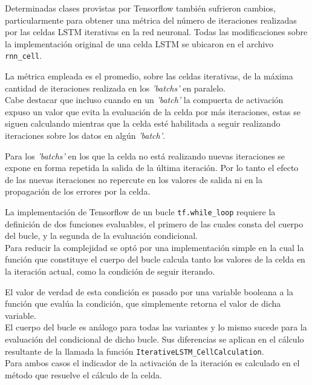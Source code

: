 \documentclass{article}
\begin{document}
Determinadas clases provistas por Tensorflow también sufrieron cambios, particularmente para obtener una métrica del número de iteraciones realizadas por las celdas LSTM iterativas en la red neuronal. Todas las modificaciones sobre la implementación original de una celda LSTM se ubicaron en el archivo \texttt{rnn\_cell}.

La métrica empleada es el promedio, sobre las celdas iterativas, de la máxima cantidad de iteraciones realizada en los \textit{'batchs'} en paralelo.\\

Cabe destacar que incluso cuando en un \textit{'batch'} la compuerta de activación expuso un valor que evita la evaluación de la celda por más iteraciones, estas se siguen calculando mientras que la celda esté habilitada a seguir realizando iteraciones sobre los datos en algún \textit{'batch'}.

Para los \textit{'batchs'} en los que la celda no está realizando nuevas iteraciones se expone en forma repetida la salida de la última iteración. Por lo tanto el efecto de las nuevas iteraciones no repercute en los valores de salida ni en la propagación de los errores por la celda.

La implementación de Tensorflow de un bucle \texttt{tf.while\_loop} requiere la definición de dos funciones evaluables, el primero de las cuales consta del cuerpo del bucle, y la segunda de la evaluación condicional.\\

Para reducir la complejidad se optó por una implementación simple en la cual la función que constituye el cuerpo del bucle calcula tanto los valores de la celda en la iteración actual, como la condición de seguir iterando.

El valor de verdad de esta condición es pasado por una variable booleana a la función que evalúa la condición, que simplemente retorna el valor de dicha variable.\\

El cuerpo del bucle es análogo para todas las variantes y lo mismo sucede para la evaluación del condicional de dicho bucle. Sus diferencias se aplican en el cálculo resultante de la llamada la función \texttt{IterativeLSTM\_CellCalculation}.\\

Para ambos casos el indicador de la activación de la iteración es calculado en el método que resuelve el cálculo de la celda.\\
\end{document}
